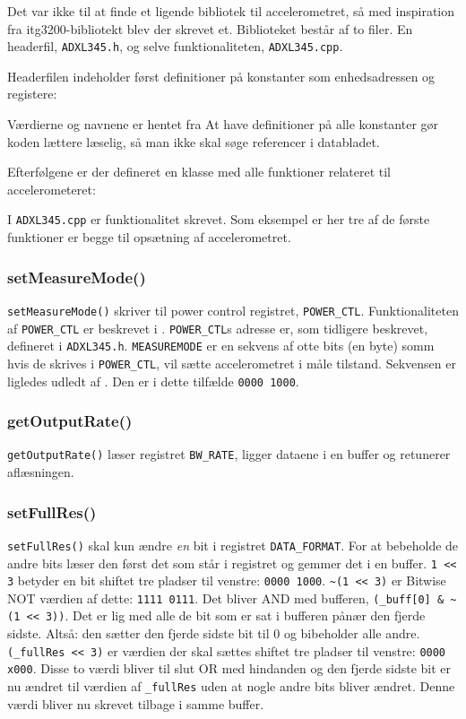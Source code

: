 \documentclass[a4paper,oneside,article,danish,table]{memoir}
\newcommand{\adxlh}[2]{}
\newcommand{\adxlc}[2]{}
\begin{document}
Det var ikke til at finde et ligende bibliotek til accelerometret, så med inspiration fra itg3200-bibliotekt blev der skrevet et. Biblioteket består af to filer. En headerfil, \texttt{ADXL345.h}, og selve funktionaliteten, \texttt{ADXL345.cpp}.

Headerfilen indeholder først definitioner på konstanter som enhedsadressen og registere:
\adxlh{23}{35}
Værdierne og navnene er hentet fra \cite[s. 23]{adxl345} At have definitioner på alle konstanter gør koden lættere læselig, så man ikke skal søge referencer i databladet.

Efterfølgene er der defineret en klasse med alle funktioner relateret til accelerometeret:
\adxlh{37}{49}

I \texttt{ADXL345.cpp} er funktionalitet skrevet. Som eksempel er her tre af de første funktioner er begge til opsætning af accelerometret.

\subsubsection{setMeasureMode()}

\adxlc{33}{36}
\lstinline{setMeasureMode()} skriver til power control registret, \lstinline{POWER_CTL}. Funktionaliteten af \lstinline{POWER_CTL} er beskrevet i \cite[s. 25--26]{adxl345}. \lstinline{POWER_CTL}s adresse er, som tidligere beskrevet, defineret i \texttt{ADXL345.h}. \lstinline{MEASUREMODE} er en sekvens af otte bits (en byte) somm hvis de skrives i \lstinline{POWER_CTL}, vil sætte accelerometret i måle tilstand. Sekvensen er ligledes udledt af \cite{adxl345}. Den er i dette tilfælde \texttt{0000\,1000}.

\subsubsection{getOutputRate()}

\adxlc{38}{42}
\lstinline{getOutputRate()} læser registret \lstinline{BW_RATE}, ligger dataene i en buffer og retunerer aflæsningen.

\subsubsection{setFullRes()}

\adxlc{56}{60}
\lstinline{setFullRes()} skal kun ændre \emph{en} bit i registret \lstinline{DATA_FORMAT}. For at bebeholde de andre bits læser den først det som står i registret og gemmer det i en buffer. \lstinline{1 << 3} betyder en bit shiftet tre pladser til venstre: \texttt{0000\,1000}.  \lstinline{~(1 << 3)} er Bitwise NOT værdien af dette: \texttt{1111\,0111}. Det bliver AND med bufferen, \lstinline{(_buff[0] & ~(1 << 3))}. Det er lig med alle de bit som er sat i bufferen pånær den fjerde sidste. Altså: den sætter den fjerde sidste bit til 0 og bibeholder alle andre. \lstinline{(_fullRes << 3)} er værdien der skal sættes shiftet tre pladser til venstre: \texttt{0000\,x000}. Disse to værdi bliver til slut OR med hindanden og den fjerde sidste bit er nu ændret til værdien af \lstinline{_fullRes} uden at nogle andre bits bliver ændret. Denne værdi bliver nu skrevet tilbage i samme buffer.
\end{document}
